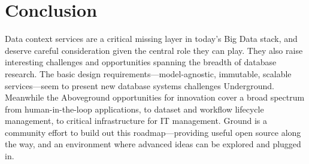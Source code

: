 \documentclass{sig-alternate}
\begin{document}
\section{Conclusion}
\label{sec:conclusion}
Data context services are a critical missing layer in today's Big Data stack, and deserve careful consideration given the central role they can play. 
They also raise interesting challenges and opportunities spanning the breadth of database research. 
The basic design requirements---model-agnostic, immutable, scalable services---seem to present new database systems challenges Underground. Meanwhile the Aboveground opportunities for innovation cover a broad spectrum from human-in-the-loop applications, to dataset and workflow lifecycle management, to critical infrastructure for IT management. 
Ground is a community effort to build out this roadmap---providing useful open source along the way, and an environment where advanced ideas can be explored and plugged in.


\end{document}

